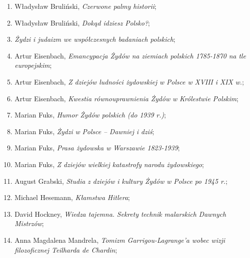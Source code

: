 \documentclass[a4paper,11pt]{article}
\begin{document}
\begin{enumerate}
\item Władysław Bruliński, \textit{Czerwone palmy historii};



\item Władysław Bruliński, \textit{Dokąd idziesz Polsko?};



\item \textit{Żydzi i judaizm we współczesnych badaniach polskich};



\item Artur Eisenbach, \textit{Emancypacja Żydów na ziemiach polskich
    1785-1870 na tle europejskim};



\item Artur Eisenbach, \textit{Z dziejów ludności żydowskiej w Polsce w
    XVIII i XIX w.};



\item Artur Eisenbach, \textit{Kwestia równouprawnienia Żydów w
    Królestwie Polskim};



\item Marian Fuks, \textit{Humor Żydów polskich (do 1939 r.)};



\item Marian Fuks, \textit{Żydzi w Polsce – Dawniej i dziś};



\item Marian Fuks, \textit{Prasa żydowska w Warszawie 1823-1939};



\item Marian Fuks, \textit{Z dziejów wielkiej katastrofy narodu
    żydowskiego};



\item August Grabski, \textit{Studia z dziejów i kultury Żydów w Polsce
    po 1945 r.};



\item Michael Hesemann, \textit{Kłamstwa Hitlera};



\item David Hockney, \textit{Wiedza tajemna. Sekrety technik malarskich
    Dawnych Mistrzów};



\item Anna Magdalena Mandrela, \textit{Tomizm Garrigou-Lagrange’a wobec
    wizji filozoficznej Teilharda de Chardin};




\end{enumerate}
\end{document}

